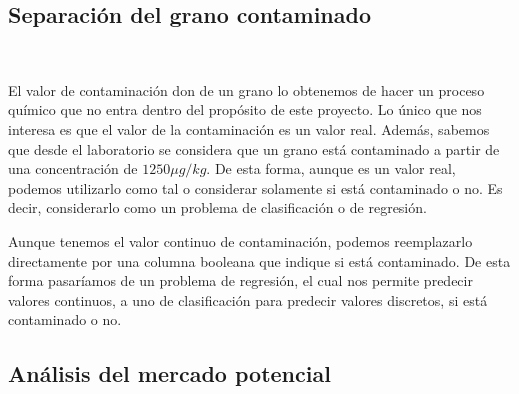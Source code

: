 \subsection{Separación del grano contaminado}\ \label{sec:separacion}




El valor de contaminación \gls{don} de un grano lo obtenemos de hacer un proceso químico que no entra dentro del propósito de este proyecto. 
Lo único que nos interesa es que el valor de la contaminación es un valor real. Además, sabemos que desde el laboratorio se considera que un grano está contaminado a 
partir de una concentración de \(1250 \mu g/kg\). De esta forma, aunque es un valor real, podemos utilizarlo como tal o considerar solamente si está contaminado o no. 
Es decir, considerarlo como un problema de \gls{clasificación} o de \gls{regresión}.

Aunque tenemos el valor continuo de contaminación, podemos reemplazarlo directamente por una columna booleana que indique si está contaminado. 
De esta forma pasaríamos de un problema de regresión, el cual nos permite predecir valores continuos, a uno de clasificación para predecir valores discretos, 
si está contaminado o no.

\subsection{Análisis del mercado potencial}





